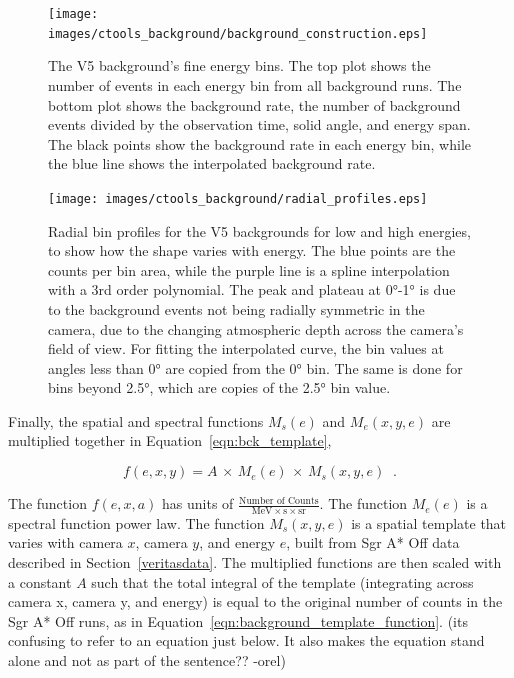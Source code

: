     \begin{figure}[p]
      \centering
      \texttt{[image: images/ctools\_background/background\_construction.eps]}
      \caption[CTOOLS Background Fine Energy Bins]{
        The V5 background's fine energy bins.
        The top plot shows the number of events in each energy bin from all background runs.
        The bottom plot shows the background rate, the number of background events divided by the observation time, solid angle, and energy span.
        The black points show the background rate in each energy bin, while the blue line shows the interpolated background rate.
      }
      \label{fig:background_profile}
    \end{figure}

    \begin{figure}[hb]
      \centering
      \texttt{[image: images/ctools\_background/radial\_profiles.eps]}
      \caption[CTOOLS Radial Background Profiles]{
        Radial bin profiles for the V5 backgrounds for low and high energies, to show how the shape varies with energy.
        The blue points are the counts per bin area, while the purple line is a spline interpolation with a 3rd order polynomial.
        The peak and plateau at \ang{0}-\ang{1} is due to the background events not being radially symmetric in the camera, due to the changing atmospheric depth across the camera's field of view.
        For fitting the interpolated curve, the bin values at angles less than \ang{0} are copied from the \ang{0} bin.
        The same is done for bins beyond \ang{2.5}, which are copies of the \ang{2.5} bin value.
        }
      \label{fig:background_radial}
    \end{figure}
    
    Finally, the spatial and spectral functions $M_{s} \left ( e \right )$ and $M_e \left(x,y,e \right )$ are multiplied together in Equation~\ref{eqn:bck_template},
    
    \begin{equation}\label{eqn:bck_template}
      f(e,x,y) = A \, \times \, M_{e} \left ( e \right ) \, \times \, M_{s} \left ( x, y, e \right ) \;\;.
    \end{equation} 
    
    The function $f(e,x,a)$ has units of $\frac{\textrm{Number of Counts}}{ \textrm{MeV} \times \textrm{s} \times \textrm{sr} }$.
    The function $M_{e}(e)$ is a spectral function power law.
    The function $M_{s}(x,y,e)$ is a spatial template that varies with camera $x$, camera $y$, and energy $e$, built from Sgr A* Off data described in Section~\ref{veritasdata}.
    The multiplied functions are then scaled with a constant $A$ such that the total integral of the template (integrating across camera x, camera y, and energy) is equal to the original number of counts in the Sgr A* Off runs, as in Equation~\ref{eqn:background_template_function}.
    {\color{red}(its confusing to refer to an equation just below.  It also makes the equation stand alone and not as part of the sentence?? -orel)}
    
